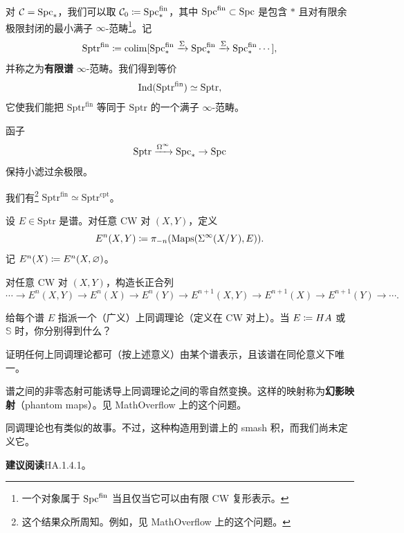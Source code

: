 \begin{example}\label{L14-5.2}
对 $\mathcal{C}=\operatorname{Spc}_{\ast}$，我们可以取 $\mathcal{C}_{0}\coloneqq\operatorname{Spc}^{\mathrm{fin}}_{\ast}$，其中 $\operatorname{Spc}^{\mathrm{fin}}\subset\operatorname{Spc}$ 是包含 $\ast$ 且对有限余极限封闭的最小满子 $\infty$-范畴\footnote{一个对象属于 $\operatorname{Spc}^{\mathrm{fin}}$ 当且仅当它可以由有限 CW 复形表示。}。记
\[
\mathrm{Sptr}^{\mathrm{fin}}\coloneqq\operatorname{colim}[\operatorname{Spc}^{\mathrm{fin}}_{\ast}\xrightarrow{\Sigma}\operatorname{Spc}^{\mathrm{fin}}_{\ast}\xrightarrow{\Sigma}\operatorname{Spc}^{\mathrm{fin}}_{\ast}\cdots],
\]
并称之为\textbf{有限谱} $\infty$-范畴。我们得到等价
\[
\operatorname{Ind}(\mathrm{Sptr}^{\mathrm{fin}})\simeq\mathrm{Sptr},
\]
它使我们能把 $\mathrm{Sptr}^{\mathrm{fin}}$ 等同于 $\mathrm{Sptr}$ 的一个满子 $\infty$-范畴。
\end{example}

\begin{exercise}\label{L14-5.3}
函子
\[
\mathrm{Sptr}\xrightarrow{\Omega^{\infty}}\operatorname{Spc}_{\ast}\to\operatorname{Spc}
\]
保持小滤过余极限。
\end{exercise}

\begin{theorem}\label{L14-5.4}
我们有\footnote{这个结果众所周知。例如，见 MathOverflow 上的这个问题。} $\mathrm{Sptr}^{\mathrm{fin}}\simeq\mathrm{Sptr}^{\mathrm{cpt}}$。
\end{theorem}


\begin{construction}\label{L14-A.1}
设 $E\in\mathrm{Sptr}$ 是谱。对任意 CW 对 $(X,Y)$，定义
\[
E^{n}(X,Y)\coloneqq\pi_{-n}(\operatorname{Maps}(\Sigma^{\infty}(X/Y),E)).
\]
记 $E^{n}(X)\coloneqq E^{n}(X,\varnothing)$。
\end{construction}

\begin{exercise}\label{L14-A.2}
对任意 CW 对 $(X,Y)$，构造长正合列
\[
\cdots\to E^{n}(X,Y)\to E^{n}(X)\to E^{n}(Y)\to E^{n+1}(X,Y)\to E^{n+1}(X)\to E^{n+1}(Y)\to\cdots.
\]
\end{exercise}

\begin{exercise}\label{L14-A.3}
给每个谱 $E$ 指派一个（广义）上同调理论（定义在 CW 对上）。当 $E\coloneqq HA$ 或 $\mathbb{S}$ 时，你分别得到什么？
\end{exercise}

\begin{exercise}\label{L14-A.4}
证明任何上同调理论都可（按上述意义）由某个谱表示，且该谱在同伦意义下唯一。
\end{exercise}

\begin{warning}\label{L14-A.5}
谱之间的非零态射可能诱导上同调理论之间的零自然变换。这样的映射称为\textbf{幻影映射}（phantom maps）。见 MathOverflow 上的这个问题。
\end{warning}

\begin{remark}\label{L14-A.6}
同调理论也有类似的故事。不过，这种构造用到谱上的 smash 积，而我们尚未定义它。
\end{remark}

\nitem\label{L14-A.7} \textbf{建议阅读}\quad HA.1.4.1。
